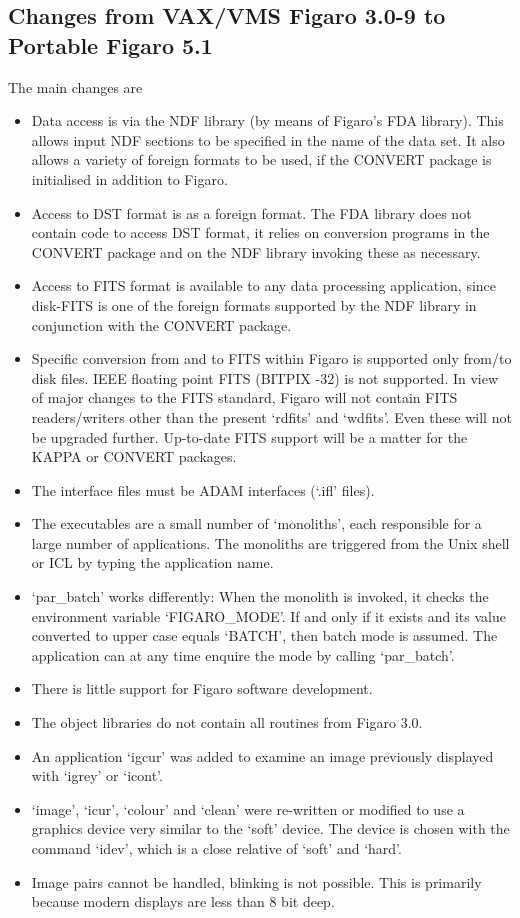 \documentclass[11pt,twoside]{article}
\begin{document}
\subsection{\label{changes}Changes from VAX/VMS Figaro 3.0-9 to Portable Figaro 5.1}

   The main changes are

\begin{itemize}
\item
   Data access is via the NDF library (by means of Figaro's FDA
   library). This allows input NDF sections to be specified in the
   name of the data set. It also allows a variety of foreign formats
   to be used, if the CONVERT package is initialised in addition to
   Figaro.
\item
   Access to DST format is as a foreign format. The FDA library does
   not contain code to access DST format, it relies on conversion
   programs in the CONVERT package and on the NDF library invoking
   these as necessary.
\item
   Access to FITS format is available to any data processing
   application, since disk-FITS is one of the foreign formats
   supported by the NDF library in conjunction with the CONVERT
   package.
\item
   Specific conversion from and to FITS within Figaro is supported
   only from/to disk files. IEEE floating point FITS (BITPIX -32) is
   not supported. In view of major changes to the FITS standard,
   Figaro will not contain FITS readers/writers other than the present
   `rdfits' and `wdfits'. Even these will not be upgraded further.
   Up-to-date FITS support will be a matter for the KAPPA or CONVERT
   packages.
\item
   The interface files must be ADAM interfaces (`.ifl' files).
\item
   The executables are a small number of `monoliths', each responsible
   for a large number of applications. The monoliths are triggered from
   the Unix shell or ICL by typing the application name.
\item
   `par\_batch' works differently: When the monolith is invoked, it
   checks the environment variable `FIGARO\_MODE'. If and only if it
   exists and its value converted to upper case equals `BATCH', then
   batch mode is assumed. The application can at any time enquire the
   mode by calling `par\_batch'.
\item
   There is little support for Figaro software development.
\item
   The object libraries do not contain all routines from Figaro 3.0.
\item
   An application `igcur' was added to examine an image previously
   displayed with `igrey' or `icont'.
\item
   `image', `icur', `colour' and  `clean' were re-written or modified to
   use a graphics device very similar to the `soft' device. The device
   is chosen with the command `idev', which is a close relative of
   `soft' and `hard'.
\item
   Image pairs cannot be handled, blinking is not possible. This is
   primarily because modern displays are less than 8 bit deep.
\end{itemize}
\end{document}

